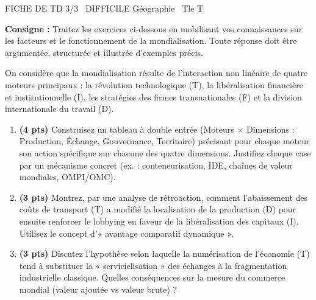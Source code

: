 \documentclass[11pt]{article}
\begin{document}
\begin{tcolorbox}[enhanced,colback=popink,colframe=popink,arc=10pt,boxrule=0pt,left=12pt,right=12pt,top=9pt,bottom=9pt]
{\color{white}\popxbold\small FICHE DE TD 3/3 \textbullet\ DIFFICILE \hfill Géographie \textbullet\ Tle T\par}
\end{tcolorbox}
\vspace{4pt}
\noindent\textbf{Consigne :} Traitez les exercices ci-dessous en mobilisant vos connaissances sur les facteurs et le fonctionnement de la mondialisation. Toute réponse doit être argumentée, structurée et illustrée d'exemples précis.

\begin{exercice}
On considère que la mondialisation résulte de l'interaction non linéaire de quatre moteurs principaux : la révolution technologique (T), la libéralisation financière et institutionnelle (I), les stratégies des firmes transnationales (F) et la division internationale du travail (D).

\begin{enumerate}
    \item \textbf{(4 pts)} Construisez un tableau à double entrée (Moteurs $\times$ Dimensions : Production, Échange, Gouvernance, Territoire) précisant pour chaque moteur son action spécifique sur chacune des quatre dimensions. Justifiez chaque case par un mécanisme concret (ex. : conteneurisation, IDE, chaînes de valeur mondiales, OMPI/OMC).
    \item \textbf{(3 pts)} Montrez, par une analyse de rétroaction, comment l'abaissement des coûts de transport (T) a modifié la localisation de la production (D) pour ensuite renforcer le lobbying en faveur de la libéralisation des capitaux (I). Utilisez le concept d'« avantage comparatif dynamique ».
    \item \textbf{(3 pts)} Discutez l'hypothèse selon laquelle la numérisation de l'économie (T) tend à substituer la « servicielisation » des échanges à la fragmentation industrielle classique. Quelles conséquences sur la mesure du commerce mondial (valeur ajoutée vs valeur brute) ?
\end{enumerate}
\end{exercice}
\end{document}
